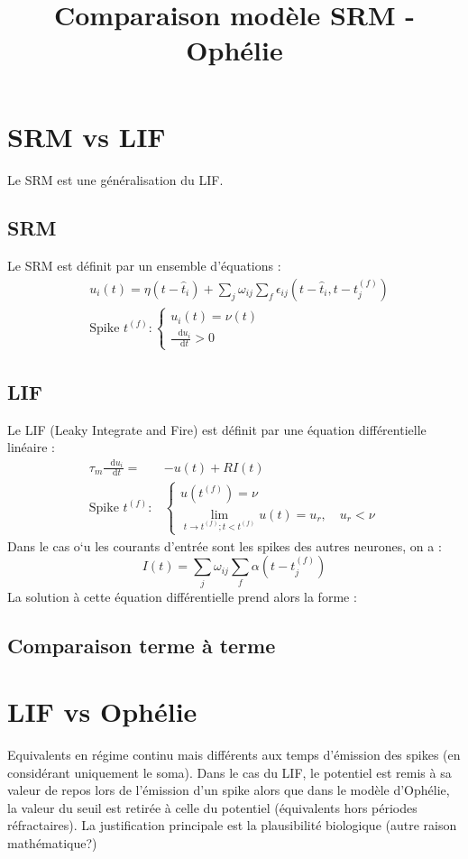 \documentclass{article}
\title{Comparaison modèle SRM - Ophélie}
\newcommand{\dd}{\mathop{}\,\mathrm{d}}
\begin{document}
\maketitle

\section*{SRM vs LIF}
	Le SRM est une généralisation du LIF\cite{1}. 
	\subsection*{SRM}
		Le SRM est d\'efinit par un ensemble d'\'equations :\begin{align*}
			&u_i(t)=\eta(t-\hat{t}_i)+\sum_j\omega_{ij}\sum_f\epsilon_{ij}(t-\hat{t}_i, t-t_j^{(f)})\\
			&\text{Spike }t^{(f)}:\begin{cases}
				u_i(t)=\nu(t)\\
				\frac{\dd u_i}{\dd t}>0
			\end{cases}
		\end{align*}
	\subsection*{LIF}
		Le LIF (Leaky Integrate and Fire) est d\'efinit par une \'equation diff\'erentielle lin\'eaire :\begin{align*}
			\tau_m\frac{\dd u_i}{\dd t}=&-u(t)+RI(t)\\
			\text{Spike }t^{(f)}:&\begin{cases}
				u(t^{(f)})=\nu\\
				\displaystyle\lim_{t\to t^{(f)}; t<t^{(f)}}u(t)=u_r,\quad u_r<\nu
			\end{cases}
		\end{align*}
		Dans le cas o`u les courants d'entr\'ee sont les spikes des autres neurones, on a :\begin{equation*}
			I(t)=\sum_j\omega_{ij}\sum_f\alpha(t-t_j^{(f)})
		\end{equation*}
		La solution \`a cette \'equation diff\'erentielle prend alors la forme :

	\subsection*{Comparaison terme \`a terme}


\section*{LIF vs Ophélie}
	Equivalents en régime continu mais différents aux temps d'émission des spikes (en considérant uniquement le soma). Dans le cas du LIF, le potentiel est remis à sa valeur de repos lors de l'émission d'un spike alors que dans le modèle d'Ophélie, la valeur du seuil est retirée à celle du potentiel (équivalents hors périodes réfractaires). La justification principale est la plausibilité biologique (autre raison mathématique?)
\end{document}
